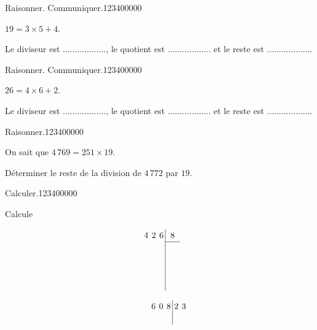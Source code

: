 \begin{pageAD} 
 

 
  
\begin{ExoCad}{Raisonner. Communiquer.}{1234}{0}{0}{0}{0}{0}

$19 = 3 \times 5 + 4$. 

Le diviseur est $\ldots\ldots\ldots\ldots\ldots\ldots$, le quotient est $\ldots\ldots\ldots\ldots\ldots\ldots$ et le reste est $\ldots\ldots\ldots\ldots\ldots\ldots$.
 
\end{ExoCad}

  
\begin{ExoCad}{Raisonner. Communiquer.}{1234}{0}{0}{0}{0}{0}

$26 = 4 \times 6 + 2$. 

Le diviseur est $\ldots\ldots\ldots\ldots\ldots\ldots$, le quotient est $\ldots\ldots\ldots\ldots\ldots\ldots$ et le reste est $\ldots\ldots\ldots\ldots\ldots\ldots$.

\end{ExoCad}


\begin{ExoCad}{Raisonner.}{1234}{0}{0}{0}{0}{0}

On sait que $4\,769 = 251 \times 19$. 

Déterminer le reste de la division de $4\,772$ par $19$. 

\end{ExoCad}





\begin{ExoCad}{Calculer.}{1234}{0}{0}{0}{0}{0}

Calcule 

\begin{minipage}{0.3\linewidth}
\begin{equation*}
\renewcommand{\arraystretch}{1.2}
\renewcommand{\arraycolsep}{2pt}
  \begin{array}{rrrr|rrr}
 & 4 & 2 & 6 &  & 8 \\
\cline{5-7}
  &   &   &  &  & \\

    &  &   &   &   &   &  \\
     &   &   &   &   &   &  \\
    &&  &   &   &   &  \\
  \end{array}
\end{equation*}
\end{minipage}
\begin{minipage}{0.3\linewidth}
\begin{equation*}
\renewcommand{\arraystretch}{1.2}
\renewcommand{\arraycolsep}{2pt}
  \begin{array}{rrrr|rrr}
 & 6 & 0 & 8& 2 & 3 \\
\cline{5-7}
  &   &   &  &  & \\


\end{array}
\end{equation*}
\end{minipage}
\end{ExoCad}
\end{pageAD}
